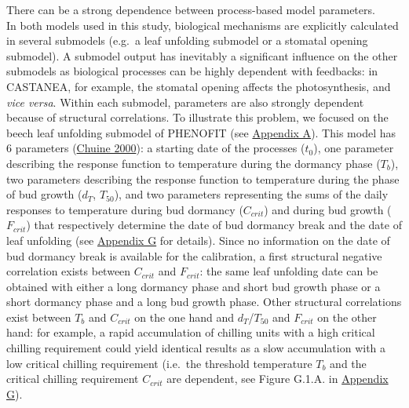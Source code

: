 \documentclass[11pt,]{article}
\begin{document}
There can be a strong dependence between process-based model
parameters.\\
In both models used in this study, biological mechanisms are explicitly
calculated in several submodels (e.g.~a leaf unfolding submodel or a
stomatal opening submodel). A submodel output has inevitably a
significant influence on the other submodels as biological processes can
be highly dependent with feedbacks: in CASTANEA, for example, the
stomatal opening affects the photosynthesis, and \emph{vice versa}.
Within each submodel, parameters are also strongly dependent because of
structural correlations. To illustrate this problem, we focused on the
beech leaf unfolding submodel of PHENOFIT (see
\protect\hyperlink{appendixA}{Appendix A}). This model has 6 parameters
(\protect\hyperlink{ref-Chuine2000}{Chuine 2000}): a starting date of
the processes (\(t_0\)), one parameter describing the response function
to temperature during the dormancy phase (\(T_b\)), two parameters
describing the response function to temperature during the phase of bud
growth (\(d_T\), \(T_{50}\)), and two parameters representing the sums
of the daily responses to temperature during bud dormancy (\(C_{crit}\))
and during bud growth (\(F_{crit}\)) that respectively determine the
date of bud dormancy break and the date of leaf unfolding (see
\protect\hyperlink{appendixG}{Appendix G} for details). Since no
information on the date of bud dormancy break is available for the
calibration, a first structural negative correlation exists between
\(C_{crit}\) and \(F_{crit}\): the same leaf unfolding date can be
obtained with either a long dormancy phase and short bud growth phase or
a short dormancy phase and a long bud growth phase. Other structural
correlations exist between \(T_b\) and \(C_{crit}\) on the one hand and
\(d_T\)/\(T_{50}\) and \(F_{crit}\) on the other hand: for example, a
rapid accumulation of chilling units with a high critical chilling
requirement could yield identical results as a slow accumulation with a
low critical chilling requirement (i.e.~the threshold temperature
\(T_{b}\) and the critical chilling requirement \(C_{crit}\) are
dependent, see Figure G.1.A. in \protect\hyperlink{appendixG}{Appendix
G}).
\end{document}
